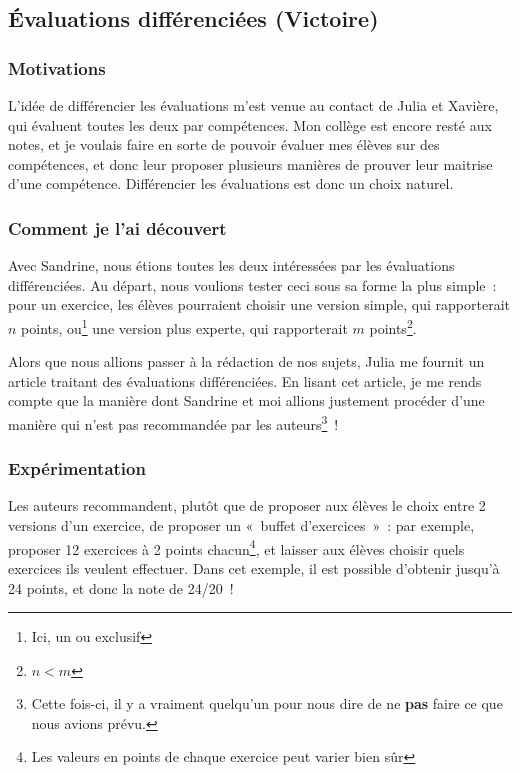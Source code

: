 \subsection{Évaluations différenciées (Victoire)}
\subsubsection{Motivations}

L'idée de différencier les évaluations m'est venue au contact de Julia et Xavière,
qui évaluent toutes les deux par compétences. Mon collège est encore resté aux
notes, et je voulais faire en sorte de pouvoir évaluer mes élèves sur des
compétences, et donc leur proposer plusieurs manières de prouver leur maitrise
d'une compétence. Différencier les évaluations est donc un choix naturel.

\subsubsection{Comment je l'ai découvert}
Avec Sandrine, nous étions toutes les deux
intéressées par les évaluations différenciées. Au départ, nous voulions tester
ceci sous sa forme la plus simple : pour un exercice, les élèves pourraient
choisir une version simple, qui rapporterait $n$ points, ou\footnote{Ici, un ou
exclusif} une version plus experte, qui rapporterait $m$ points\footnote{$n < m$}.

Alors que nous allions passer à la rédaction de nos sujets, Julia me fournit
un article traitant des évaluations différenciées\cite{differenciation_devoir_surveille}.
En lisant cet article, je me rends compte que la manière dont Sandrine et moi
allions justement procéder d'une manière qui n'est pas recommandée par les
auteurs\footnote{Cette fois-ci, il y a vraiment quelqu'un pour nous dire de ne
\textbf{pas} faire ce que nous avions prévu.} !

\subsubsection{Expérimentation}

Les auteurs recommandent, plutôt que de proposer aux élèves le choix entre 2
versions d'un exercice, de proposer un « buffet d'exercices » : par exemple, proposer
12 exercices à 2 points chacun\footnote{Les valeurs en points de chaque exercice
peut varier bien sûr}, et laisser aux élèves choisir quels exercices ils veulent
effectuer. Dans cet exemple, il est possible d'obtenir jusqu'à 24 points, et
donc la note de 24/20 !

